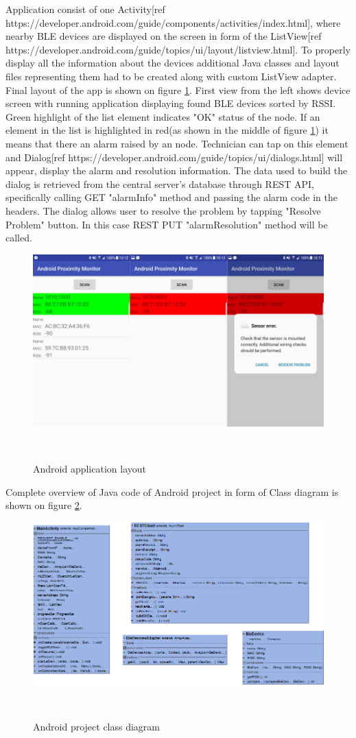 Application consist of one Activity[ref https://developer.android.com/guide/components/activities/index.html], where nearby BLE devices are displayed on the screen in form of the ListView[ref https://developer.android.com/guide/topics/ui/layout/listview.html]. To properly display all the information about the devices additional Java classes and layout files representing them had to be created along with custom ListView adapter. Final layout of the app is shown on figure \ref{fig:AndroidScreenshots}. First view from the left shows device screen with running application displaying found BLE devices sorted by RSSI. Green highlight of the list element indicates "OK" status of the node. If an element in the list is highlighted in red(as shown in the middle of figure \ref{fig:AndroidScreenshots}) it means that there an alarm raised by an node. Technician can tap on this element and Dialog[ref https://developer.android.com/guide/topics/ui/dialogs.html] will appear, display the alarm and resolution information. The data used to build the dialog is retrieved from the central server's database through REST API, specifically calling GET "alarmInfo" method and passing the alarm code in the headers. The dialog allows user to resolve the problem by tapping "Resolve Problem" button. In this case REST PUT "alarmResolution" method will be called.

\begin{figure}[H]
\centering
\includegraphics[scale=0.65]{gfx/AndroidScreenshots}
\caption{Android application layout}~\label{fig:AndroidScreenshots}
\end{figure}

Complete overview of Java code of Android project in form of Class diagram is shown on figure \ref{fig:AndroidClass}. 

\begin{figure}[H]
\centering
\includegraphics[scale=0.45]{gfx/AndroidClassDiagram}
\caption{Android project class diagram}~\label{fig:AndroidClass}
\end{figure}
